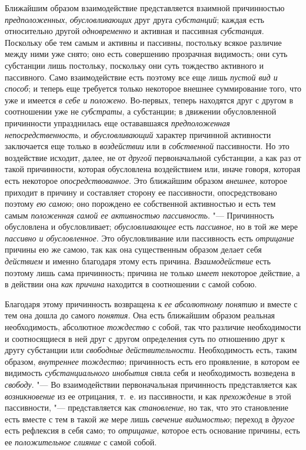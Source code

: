 Ближайшим образом взаимодействие представляется взаимной причинностью
{\em предположенных},
{\em обусловливающих} друг друга
{\em субстанций}; каждая есть относительно другой
{\em одновременно} и активная и пассивная
{\em субстанция}. Поскольку обе тем самым и активны и
пассивны, постольку всякое различие между ними уже снято; оно есть
совершению прозрачная видимость; они суть субстанции лишь постольку,
поскольку они суть тождество активного и пассивного. Само взаимодействие
есть поэтому все еще лишь {\em пустой вид и способ}; и
теперь еще требуется только некоторое внешнее суммирование того, что уже и
имеется {\em в себе и положено}. Во-первых, теперь
находятся друг с другом в соотношении уже не
{\em субстраты}, а субстанции; в движении обусловленной
причинности упразднилась еще остававшаяся
{\em предположенная непосредственность}, и
{\em обусловливающий} характер причинной активности
заключается еще только в {\em воздействии} или в
{\em собственной} пассивности. Но это воздействие
исходит, далее, не от {\em другой} первоначальной
субстанции, а как раз от такой причинности, которая обусловлена
воздействием или, иначе говоря, которая есть некоторое
{\em опосредствованное}. Это ближайшим образом
{\em внешнее}, которое приходит в причину и составляет
сторону ее пассивности, опосредствовано поэтому {\em ею
самою}; оно порождено ее собственной активностью и есть тем самым
{\em положенная самой ее активностью пассивность}. "---
Причинность обусловлена и обусловливает; {\em обусловливающее} есть
{\em пассивное}, но в той же мере
{\em пассивно и обусловленное}. Это обусловливание или
пассивность есть {\em отрицание} причины ею же самою,
так как она существенным образом делает себя
{\em действием} и именно благодаря этому есть причина.
{\em Взаимодействие} есть поэтому лишь сама
причинность; причина не только {\em имеет} некоторое
действие, а в действии она {\em как причина} находится
в соотношении с самой собою.

Благодаря этому причинность возвращена к {\em ее
абсолютному понятию} и вместе с тем она дошла до самого
{\em понятия}. Она есть ближайшим образом реальная
необходимость, абсолютное {\em тождество} с собой, так
что различие необходимости и соотносящиеся в ней друг с другом определения
суть по отношению друг к другу субстанции или
{\em свободные действительности}. Необходимость есть,
таким образом, {\em внутреннее тождество}; причинность
есть его проявление, в котором ее видимость
{\em субстанциального инобытия} сняла себя и
необходимость возведена в {\em свободу}. "--- Во
взаимодействии первоначальная причинность представляется как
{\em возникновение} из ее отрицания, т.~е. из
пассивности, и как {\em прехождение} в этой
пассивности, "--- представляется как {\em становление}, но
так, что это становление есть вместе с тем в такой же мере лишь
{\em свечение видимостью}; переход в
{\em другое} есть рефлексия в себя само; то
{\em отрицание}, которое есть основание причины, есть
ее {\em положительное слияние} с самой собой.


